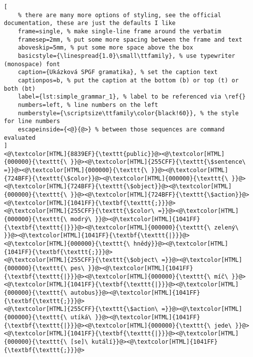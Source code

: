 \begin{lstlisting}[
	% there are many more options of styling, see the official documentation, these are just the defaults I like
	frame=single, % make single-line frame around the verbatim
	framesep=2mm, % put some more spacing between the frame and text
	aboveskip=5mm, % put some more space above the box
	basicstyle={\linespread{1.0}\small\ttfamily}, % use typewriter (monospace) font
	caption={Ukázková SPGF gramatika}, % set the caption text
	captionpos=b, % put the caption at the bottom (b) or top (t) or both (bt)
	label={lst:simple_grammar_1}, % label to be referenced via \ref{}
	numbers=left, % line numbers on the left
	numberstyle={\scriptsize\ttfamily\color{black!60}}, % the style for line numbers
	escapeinside={<@}{@>} % between those sequences are command evaluated
]
<@\textcolor[HTML]{8839EF}{\texttt{public}}@><@\textcolor[HTML]{000000}{\texttt{\ }}@><@\textcolor[HTML]{255CFF}{\texttt{\$sentence\ =}}@><@\textcolor[HTML]{000000}{\texttt{\ }}@><@\textcolor[HTML]{724BFF}{\texttt{\$color}}@><@\textcolor[HTML]{000000}{\texttt{\ }}@><@\textcolor[HTML]{724BFF}{\texttt{\$object}}@><@\textcolor[HTML]{000000}{\texttt{\ }}@><@\textcolor[HTML]{724BFF}{\texttt{\$action}}@><@\textcolor[HTML]{1041FF}{\textbf{\texttt{;}}}@>
<@\textcolor[HTML]{255CFF}{\texttt{\$color\ =}}@><@\textcolor[HTML]{000000}{\texttt{\ modrý\ }}@><@\textcolor[HTML]{1041FF}{\textbf{\texttt{|}}}@><@\textcolor[HTML]{000000}{\texttt{\ zelený\ }}@><@\textcolor[HTML]{1041FF}{\textbf{\texttt{|}}}@><@\textcolor[HTML]{000000}{\texttt{\ hnědý}}@><@\textcolor[HTML]{1041FF}{\textbf{\texttt{;}}}@>
<@\textcolor[HTML]{255CFF}{\texttt{\$object\ =}}@><@\textcolor[HTML]{000000}{\texttt{\ pes\ }}@><@\textcolor[HTML]{1041FF}{\textbf{\texttt{|}}}@><@\textcolor[HTML]{000000}{\texttt{\ míč\ }}@><@\textcolor[HTML]{1041FF}{\textbf{\texttt{|}}}@><@\textcolor[HTML]{000000}{\texttt{\ autobus}}@><@\textcolor[HTML]{1041FF}{\textbf{\texttt{;}}}@>
<@\textcolor[HTML]{255CFF}{\texttt{\$action\ =}}@><@\textcolor[HTML]{000000}{\texttt{\ utíká\ }}@><@\textcolor[HTML]{1041FF}{\textbf{\texttt{|}}}@><@\textcolor[HTML]{000000}{\texttt{\ jede\ }}@><@\textcolor[HTML]{1041FF}{\textbf{\texttt{|}}}@><@\textcolor[HTML]{000000}{\texttt{\ [se]\ kutálí}}@><@\textcolor[HTML]{1041FF}{\textbf{\texttt{;}}}@>

\end{lstlisting}

